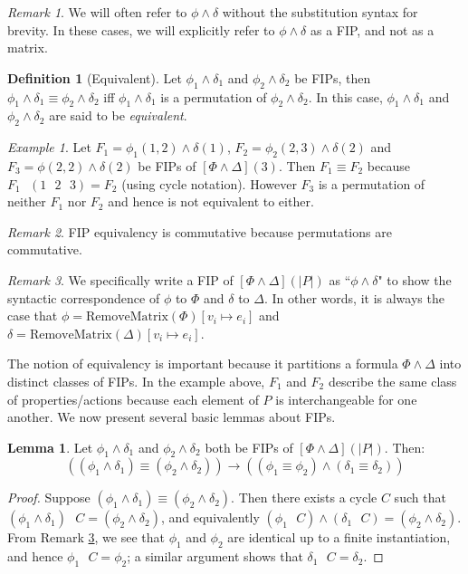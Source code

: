 \documentclass[12pt]{article}
\theoremstyle{definition}
\newtheorem{lemma}{Lemma}
\newtheorem{definition}{Definition}
\theoremstyle{remark}
\newtheorem{example}{Example}
\newtheorem{remark}{Remark}
\newcommand{\msp}{\text{ }}
\begin{document}
\begin{remark}
  We will often refer to $\phi\land\delta$ without the substitution syntax for brevity.  In these cases, we will explicitly refer to $\phi\land\delta$ as a FIP, and not as a matrix.
\end{remark}

\begin{definition}[Equivalent]
  Let $\phi_1\land\delta_1$ and $\phi_2\land\delta_2$ be FIPs, then $\phi_1\land\delta_1 \equiv \phi_2\land\delta_2$ iff $\phi_1\land\delta_1$ is a permutation of $\phi_2\land\delta_2$.  In this case, $\phi_1\land\delta_1$ and $\phi_2\land\delta_2$ are said to be \textit{equivalent}.
\end{definition}

\begin{example}
  Let $F_1 = \phi_1(1,2) \land \delta(1)$, $F_2 = \phi_2(2,3) \land \delta(2)$ and $F_3 = \phi(2,2) \land \delta(2)$ be FIPs of $[\Phi\land\Delta](3)$.  Then $F_1 \equiv F_2$ because $F_1 \msp (1 \msp 2 \msp 3) = F_2$ (using cycle notation).  However $F_3$ is a permutation of neither $F_1$ nor $F_2$ and hence is not equivalent to either.
\end{example}

\begin{remark}
  \label{rmk:fip-eq-comm}
  FIP equivalency is commutative because permutations are commutative.
\end{remark}

\begin{remark}
  \label{rmk:fip-syntax}
  We specifically write a FIP of $[\Phi\land\Delta](|P|)$ as ``$\phi\land\delta$" to show the syntactic correspondence of $\phi$ to $\Phi$ and $\delta$ to $\Delta$.  In other words, it is always the case that $\phi = \text{RemoveMatrix}(\Phi)[v_i \mapsto e_i]$ and $\delta = \text{RemoveMatrix}(\Delta)[v_i \mapsto e_i]$.
\end{remark}

The notion of equivalency is important because it partitions a formula $\Phi \land \Delta$ into distinct classes of FIPs.  In the example above, $F_1$ and $F_2$ describe the same class of properties/actions because each element of $P$ is interchangeable for one another.  We now present several basic lemmas about FIPs.

\begin{lemma}
  \label{lem:and-decomp}
  Let $\phi_1\land\delta_1$ and $\phi_2\land\delta_2$ both be FIPs of $[\Phi\land\Delta](|P|)$.  Then:
  $$((\phi_1\land\delta_1) \equiv (\phi_2\land\delta_2)) \rightarrow ((\phi_1 \equiv \phi_2) \land (\delta_1 \equiv \delta_2))$$
\end{lemma}
\begin{proof}
  Suppose $(\phi_1\land\delta_1) \equiv (\phi_2\land\delta_2)$.  Then there exists a cycle $C$ such that $(\phi_1\land\delta_1) \msp C = (\phi_2\land\delta_2)$, and equivalently $(\phi_1 \msp C) \land (\delta_1 \msp C) = (\phi_2\land\delta_2)$.  From Remark \ref{rmk:fip-syntax}, we see that $\phi_1$ and $\phi_2$ are identical up to a finite instantiation, and hence $\phi_1 \msp C = \phi_2$; a similar argument shows that $\delta_1 \msp C = \delta_2$.
\end{proof}
\end{document}
